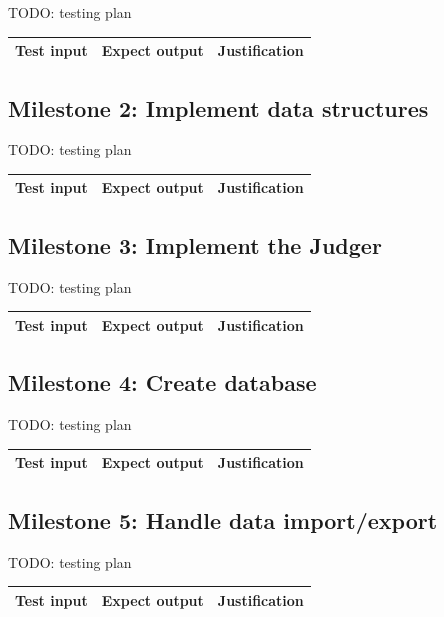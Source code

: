 \documentclass[a4paper]{report}
\begin{document}
TODO: testing plan

\begin{tabulary}{\textwidth}{|L|L|L|}
    \hline
    Test input & Expect output & Justification \\
    \hline
\end{tabulary}

\subsection{Milestone 2: Implement data structures}

TODO: testing plan

\begin{tabulary}{\textwidth}{|L|L|L|}
    \hline
    Test input & Expect output & Justification \\
    \hline
\end{tabulary}

\subsection{Milestone 3: Implement the Judger}

TODO: testing plan

\begin{tabulary}{\textwidth}{|L|L|L|}
    \hline
    Test input & Expect output & Justification \\
    \hline
\end{tabulary}

\subsection{Milestone 4: Create database}

TODO: testing plan

\begin{tabulary}{\textwidth}{|L|L|L|}
    \hline
    Test input & Expect output & Justification \\
    \hline
\end{tabulary}

\subsection{Milestone 5: Handle data import/export}

TODO: testing plan

\begin{tabulary}{\textwidth}{|L|L|L|}
    \hline
    Test input & Expect output & Justification \\
    \hline
\end{tabulary}
\end{document}
